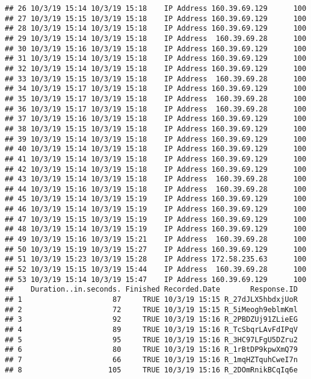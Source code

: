 \documentclass[]{article}
\begin{document}
\begin{verbatim}
## 26 10/3/19 15:14 10/3/19 15:18    IP Address 160.39.69.129      100
## 27 10/3/19 15:15 10/3/19 15:18    IP Address 160.39.69.129      100
## 28 10/3/19 15:14 10/3/19 15:18    IP Address 160.39.69.129      100
## 29 10/3/19 15:14 10/3/19 15:18    IP Address  160.39.69.28      100
## 30 10/3/19 15:16 10/3/19 15:18    IP Address 160.39.69.129      100
## 31 10/3/19 15:14 10/3/19 15:18    IP Address 160.39.69.129      100
## 32 10/3/19 15:14 10/3/19 15:18    IP Address 160.39.69.129      100
## 33 10/3/19 15:15 10/3/19 15:18    IP Address  160.39.69.28      100
## 34 10/3/19 15:17 10/3/19 15:18    IP Address 160.39.69.129      100
## 35 10/3/19 15:17 10/3/19 15:18    IP Address  160.39.69.28      100
## 36 10/3/19 15:17 10/3/19 15:18    IP Address  160.39.69.28      100
## 37 10/3/19 15:16 10/3/19 15:18    IP Address 160.39.69.129      100
## 38 10/3/19 15:15 10/3/19 15:18    IP Address 160.39.69.129      100
## 39 10/3/19 15:14 10/3/19 15:18    IP Address 160.39.69.129      100
## 40 10/3/19 15:14 10/3/19 15:18    IP Address 160.39.69.129      100
## 41 10/3/19 15:14 10/3/19 15:18    IP Address 160.39.69.129      100
## 42 10/3/19 15:14 10/3/19 15:18    IP Address 160.39.69.129      100
## 43 10/3/19 15:14 10/3/19 15:18    IP Address  160.39.69.28      100
## 44 10/3/19 15:16 10/3/19 15:18    IP Address  160.39.69.28      100
## 45 10/3/19 15:14 10/3/19 15:19    IP Address 160.39.69.129      100
## 46 10/3/19 15:14 10/3/19 15:19    IP Address 160.39.69.129      100
## 47 10/3/19 15:15 10/3/19 15:19    IP Address 160.39.69.129      100
## 48 10/3/19 15:14 10/3/19 15:19    IP Address 160.39.69.129      100
## 49 10/3/19 15:16 10/3/19 15:21    IP Address  160.39.69.28      100
## 50 10/3/19 15:19 10/3/19 15:27    IP Address 160.39.69.129      100
## 51 10/3/19 15:23 10/3/19 15:28    IP Address 172.58.235.63      100
## 52 10/3/19 15:15 10/3/19 15:44    IP Address  160.39.69.28      100
## 53 10/3/19 15:14 10/3/19 15:47    IP Address 160.39.69.129      100
##    Duration..in.seconds. Finished Recorded.Date       Response.ID
## 1                     87     TRUE 10/3/19 15:15 R_27dJLX5hbdxjUoR
## 2                     72     TRUE 10/3/19 15:15 R_5iMeogh9eblmKml
## 3                     92     TRUE 10/3/19 15:16 R_2PBDZUj91ZLieEG
## 4                     89     TRUE 10/3/19 15:16 R_TcSbqrLAvFdIPqV
## 5                     95     TRUE 10/3/19 15:16 R_3HC97LFgU5DZru2
## 6                     80     TRUE 10/3/19 15:16 R_1rBtDP9kpwXmQ79
## 7                     66     TRUE 10/3/19 15:16 R_1mqHZTquhCweI7n
## 8                    105     TRUE 10/3/19 15:16 R_2DOmRnikBCqIq6e

\end{verbatim}
\end{document}
